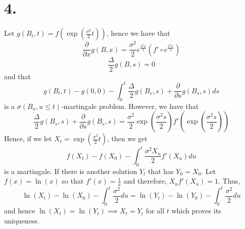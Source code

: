 \documentclass[11pt]{article}
\begin{document}
\section*{4.}
Let $g(B_t,t) = f\left( \exp \left(\frac{\sigma^2}{2}t \right)\right)$, hence we have that 
\[
    \frac{\partial}{\partial x} g(B,x) = \frac{\sigma^2}{2} e^{\frac{\sigma^2 x}{2}} \left(f' \circ e^{\frac{\sigma^2 x}{2}} \right)
\]
\[
    \frac{\Delta}{2}g(B,s) = 0
\]
and that 
\[
    g(B_t,t) - g(0,0) - \int_0^t \frac{\Delta}{2} g(B_s,s) + \frac{\partial }{\partial s}g(B_s,s) ds   
\]
is a $\sigma(B_u, u \le t)$-martingale problem.
However, we have that 
\[
    \frac{\Delta}{2}g(B_s,s) + \frac{\partial }{\partial s}g(B_s,s) = \frac{\sigma^2}{2}\exp\left( \frac{\sigma^2s}{2} \right) f' \left( \exp\left( \frac{\sigma^2 s }{2} \right)\right)    
\]
Hence, if we let $X_t = \exp\left(\frac{\sigma^2}{2}t\right)$, then we get 
\[
    f(X_t) - f(X_0) - \int_0^t  \frac{\sigma^2 X_u}{2}f'(X_u)  du    
\]
is a martingale. If there is another solution $Y_t$ that has $Y_0 = X_0$. Let $f(x) = \ln(x)$ so that 
$f'(x) = \frac{1}{x}$ and therefore, $X_u f'(X_u) = 1$. Thus, 
\[
    \ln(X_t) - \ln(X_0) - \int_0^t \frac{\sigma^2}{2} du = \ln(Y_t) - \ln(Y_0) - \int_0^t \frac{\sigma^2}{2} du     
\]
and hence $\ln(X_t) = \ln(Y_t) \implies X_t = Y_t$ for all $t$ which proves its uniqueness.
\end{document}
